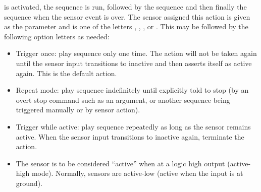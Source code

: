\begin{list}{}{}
is activated, the sequence
is run, followed by the sequence
and then finally the sequence
when the sensor event is over.  The sensor assigned this action is given
as the parameter
and is one of the letters 
,
,
,
or
.
This may be followed by the following option letters as needed:
\begin{itemize}
\item[{\codetype{o}}]
Trigger once: play sequence
only one time.  The action will not be taken again until the sensor
input transitions to inactive and then asserts itself as active again.
This is the default action.
\item[{\codetype{r}}]
Repeat mode: play sequence
indefinitely until explicitly told to stop (by an overt stop command
such as an
argument, or another sequence being triggered manually or by sensor
action).
\item[{\codetype{w}}]
Trigger while active: play sequence
repeatedly as long as the sensor remains active.  When the sensor input
transitions to inactive again, terminate the action.
\item[{\codetype{+}}]
The sensor is to be considered ``active'' when at a logic
high output (active-high mode).  Normally, sensors are active-low
(active when the input is at ground).
\end{itemize}



\end{list}
